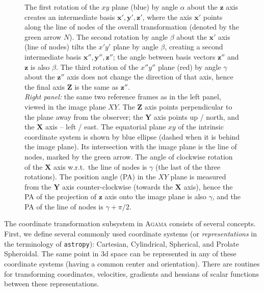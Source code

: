 \documentclass[12pt]{article}
\newcommand{\Agama}{\textsc{Agama}\xspace}
\newcommand{\bx}{\boldsymbol{x}}
\newcommand{\by}{\boldsymbol{y}}
\newcommand{\bz}{\boldsymbol{z}}
\newcommand{\bX}{\boldsymbol{X}}
\newcommand{\bY}{\boldsymbol{Y}}
\newcommand{\bZ}{\boldsymbol{Z}}
\begin{document}
\begin{figure}
{The first rotation of the $xy$ plane (blue) by angle $\alpha$ about the $\bz$ axis creates an intermediate basis $\bx',\by',\bz'$, where the axis $\bx'$ points along the line of nodes of the overall transformation (denoted by the green arrow $N$).
The second rotation by angle $\beta$ about the $\bx'$ axis (line of nodes) tilts the $x'y'$ plane by angle $\beta$, creating a second intermediate basis $\bx'',\by'',\bz''$; the angle between basis vectors $\bz''$ and $\bz$ is also $\beta$.
The third rotation of the $x''y''$ plane (red) by angle $\gamma$ about the $\bz''$ axis does not change the direction of that axis, hence the final axis $\bZ$ is the same as $\bz''$. \protect\\
\textit{Right panel:} the same two reference frames as in the left panel, viewed in the image plane $XY$. The $\bZ$ axis points perpendicular to the plane away from the observer; the $\bY$ axis points up / north, and the $\bX$ axis -- left / east. The equatorial plane $xy$ of the intrinsic coordinate system is shown by blue ellipse (dashed when it is behind the image plane). Its intersection with the image plane is the line of nodes, marked by the green arrow. The angle of clockwise rotation of the $\bX$ axis w.r.t.\ the line of nodes is $\gamma$ (the last of the three rotations). The position angle (PA) in the $XY$ plane is measured from the $\bY$ axis counter-clockwise (towards the $\bX$ axis), hence the PA of the projection of $\bz$ axis onto the image plane is also $\gamma$, and the PA of the line of nodes is $\gamma+\pi/2$.
} \label{fig:EulerAngles}
\end{figure}

The coordinate transformation subsystem in \Agama consists of several concepts.
First, we define several commonly used coordinate systems (or \textit{representations} in the terminology of \texttt{astropy}): Cartesian, Cylindrical, Spherical, and Prolate Spheroidal. The same point in 3d space can be represented in any of these coordinate systems (having a common center and orientation). There are routines for transforming coordinates, velocities, gradients and hessians of scalar functions between these representations.
\end{document}
